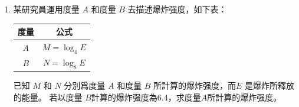 \documentclass[11pt]{article}
\begin{document}
\begin{enumerate}
        \hrulefill
            
            \hrulefill
            
            \hrulefill
            
            \hrulefill
            
            \hrulefill
            
            \hrulefill
            
            \hrulefill
            
            \hrulefill
            
            \hrulefill
            
            \hrulefill

        \pagebreak
        \item 某研究員運用度量 $A$ 和度量 $B$ 去描述爆炸强度，如下表：
        \begin{center}
            \begin{tabular}{ |c|c| }
                \hline
                度量&公式\\
                \hline
                $A$&$M=\log_4{E}$\\
                \hline
                $B$&$N=\log_8{E}$\\
                \hline
            \end{tabular}
        \end{center}
        已知 $M$ 和 $N$ 分別爲度量 $A$ 和度量 $B$ 所計算的爆炸强度，而$E$ 是爆炸所釋放的能量。 若以度量 $B$計算的爆炸强度為6.4，求度量$A$所計算的爆炸强度。

        \hrulefill
            
            \hrulefill
            
            \hrulefill
            
            \hrulefill
            
            \hrulefill
            
            \hrulefill
            
            \hrulefill
            
            \hrulefill
            
            \hrulefill
            
            \hrulefill

            \hrulefill
            
            \hrulefill
            
            \hrulefill
            

\end{enumerate}
\end{document}
